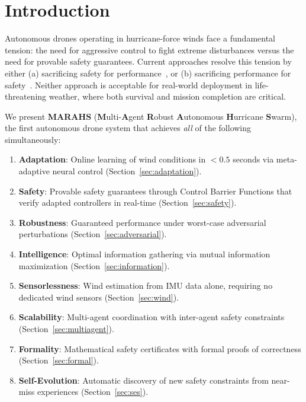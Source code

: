 \section{Introduction}

Autonomous drones operating in hurricane-force winds face a fundamental tension: the need for aggressive control to fight extreme disturbances versus the need for provable safety guarantees. Current approaches resolve this tension by either (a) sacrificing safety for performance~\cite{ppo_hurricane}, or (b) sacrificing performance for safety~\cite{cbf_quadrotor}. Neither approach is acceptable for real-world deployment in life-threatening weather, where both survival and mission completion are critical.

We present \textbf{MARAHS} (\textbf{M}ulti-\textbf{A}gent \textbf{R}obust \textbf{A}utonomous \textbf{H}urricane \textbf{S}warm), the first autonomous drone system that achieves \emph{all} of the following simultaneously:

\begin{enumerate}
    \item \textbf{Adaptation}: Online learning of wind conditions in $<0.5$ seconds via meta-adaptive neural control (Section~\ref{sec:adaptation}).
    \item \textbf{Safety}: Provable safety guarantees through Control Barrier Functions that verify adapted controllers in real-time (Section~\ref{sec:safety}).
    \item \textbf{Robustness}: Guaranteed performance under worst-case adversarial perturbations (Section~\ref{sec:adversarial}).
    \item \textbf{Intelligence}: Optimal information gathering via mutual information maximization (Section~\ref{sec:information}).
    \item \textbf{Sensorlessness}: Wind estimation from IMU data alone, requiring no dedicated wind sensors (Section~\ref{sec:wind}).
    \item \textbf{Scalability}: Multi-agent coordination with inter-agent safety constraints (Section~\ref{sec:multiagent}).
    \item \textbf{Formality}: Mathematical safety certificates with formal proofs of correctness (Section~\ref{sec:formal}).
    \item \textbf{Self-Evolution}: Automatic discovery of new safety constraints from near-miss experiences (Section~\ref{sec:ses}).
\end{enumerate}

